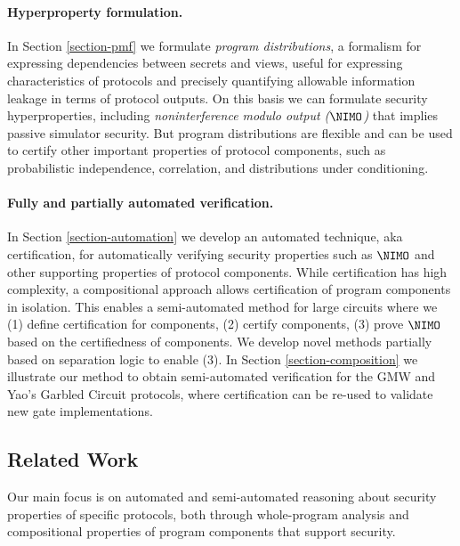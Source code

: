\paragraph{Hyperproperty formulation.} In Section \ref{section-pmf} we
formulate \emph{program distributions}, a formalism for expressing
dependencies between secrets and views, useful for expressing
characteristics of protocols and precisely quantifying allowable
information leakage in terms of protocol outputs. On this basis we can
formulate security hyperproperties, including \emph{noninterference
modulo output ($\NIMO$)} that implies passive simulator security. But
program distributions are flexible and can be used to certify other
important properties of protocol components, such as probabilistic
independence, correlation, and distributions under conditioning.

\paragraph{Fully and partially automated verification.} In Section
\ref{section-automation} we develop an automated technique, aka
certification, for automatically verifying security properties such as
$\NIMO$ and other supporting properties of protocol components.  While
certification has high complexity, a compositional approach allows
certification of program components in isolation.  This enables a
semi-automated method for large circuits where we (1) define
certification for components, (2) certify components, (3) prove
$\NIMO$ based on the certifiedness of components. We develop novel
methods partially based on separation logic
\cite{barthe2019probabilistic} to enable (3).  In Section
\ref{section-composition} we illustrate our method to obtain
semi-automated verification for the GMW and Yao's Garbled
Circuit protocols, where certification can be re-used to validate new
gate implementations.

\compfig

\subsection{Related Work}
\label{section-related-work}

Our main focus is on automated and semi-automated reasoning about
security properties of specific protocols, both through whole-program
analysis and compositional properties of program components that
support security.

